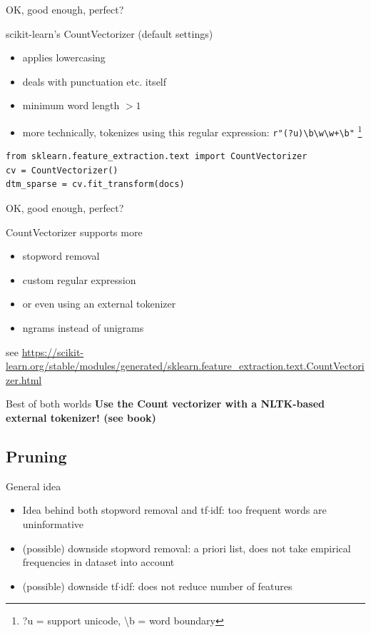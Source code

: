 \documentclass[compress]{beamer}
\begin{document}
\begin{frame}[fragile]{OK, good enough, perfect?}
\begin{block}{scikit-learn's CountVectorizer (default settings)}
\begin{itemize}
	\item applies lowercasing
	\item deals with punctuation etc. itself
	\item minimum word length $>1$
	\item more technically, tokenizes using this regular expression: \texttt{r"(?u)\textbackslash b\textbackslash w\textbackslash w+\textbackslash b"} \footnote{?u = support unicode, \textbackslash b = word boundary}
\end{itemize}
\end{block}
\begin{lstlisting}
from sklearn.feature_extraction.text import CountVectorizer
cv = CountVectorizer()
dtm_sparse = cv.fit_transform(docs)
\end{lstlisting}
\end{frame}


\begin{frame}{OK, good enough, perfect?}
\begin{block}{CountVectorizer supports more}
\begin{itemize}
\item stopword removal
\item custom regular expression
\item or even using an external tokenizer
\item ngrams instead of unigrams
\end{itemize}
\end{block}
\tiny{see \url{https://scikit-learn.org/stable/modules/generated/sklearn.feature\_extraction.text.CountVectorizer.html}}

\pause
\begin{alertblock}{Best of both worlds}
\textbf{Use the Count vectorizer with a NLTK-based external tokenizer! (see book)}
\end{alertblock}
\end{frame}


\subsection{Pruning}

\begin{frame}{General idea}
\begin{itemize}
	\item Idea behind both stopword removal and tf$\cdot$idf: too frequent words are uninformative
	\item<2-> (possible) downside stopword removal: a priori list, does not take empirical frequencies in dataset into account
	\item<3-> (possible) downside tf$\cdot$idf: does not reduce number of features
\end{itemize}

\end{frame}
\end{document}
